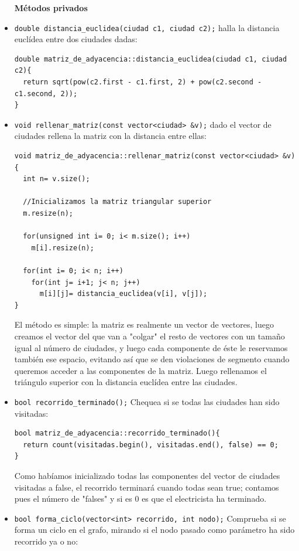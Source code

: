 \documentclass[12pt]{article}
\begin{document}
\begin{itemize}[wide, nosep, labelindent = 0pt, topsep = 1ex]
\item[\textbf{Métodos privados}] 
\item \verb|double distancia_euclidea(ciudad c1, ciudad c2);| halla la distancia euclídea entre dos ciudades dadas:
\begin{lstlisting}
double matriz_de_adyacencia::distancia_euclidea(ciudad c1, ciudad c2){
  return sqrt(pow(c2.first - c1.first, 2) + pow(c2.second - c1.second, 2));
}
\end{lstlisting} 
\item \verb|void rellenar_matriz(const vector<ciudad> &v);| dado el vector de ciudades rellena la matriz con la distancia entre ellas: 
\begin{lstlisting}
void matriz_de_adyacencia::rellenar_matriz(const vector<ciudad> &v){
  int n= v.size();

  //Inicializamos la matriz triangular superior
  m.resize(n);

  for(unsigned int i= 0; i< m.size(); i++)
    m[i].resize(n);

  for(int i= 0; i< n; i++)
    for(int j= i+1; j< n; j++)
      m[i][j]= distancia_euclidea(v[i], v[j]);
}
\end{lstlisting}

El método es simple: la matriz es realmente un vector de vectores, luego creamos el vector del que van a "colgar" el resto de vectores con un tamaño igual al número de ciudades, y luego cada componente de éste le reservamos también ese espacio, evitando así que se den violaciones de segmento cuando queremos acceder a las componentes de la matriz. Luego rellenamos el triángulo superior con la distancia euclídea entre las ciudades.

\item  \verb|bool recorrido_terminado();| Chequea si se todas las ciudades han sido visitadas: 
\begin{lstlisting}
bool matriz_de_adyacencia::recorrido_terminado(){
  return count(visitadas.begin(), visitadas.end(), false) == 0;
}
\end{lstlisting}

Como habíamos inicializado todas las componentes del vector de ciudades visitadas a false, el recorrido terminará cuando todas sean true; contamos pues el número de "falses" y si es 0 es que el electricista ha terminado. 

\item \verb|bool forma_ciclo(vector<int> recorrido, int nodo);| Comprueba si se forma un ciclo en el grafo, mirando si el nodo pasado como parámetro ha sido recorrido ya o no: 


\end{itemize}
\end{document}
